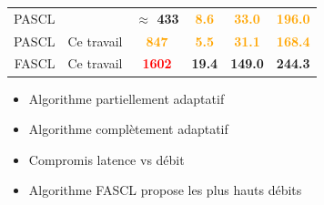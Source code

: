 \documentclass[t,compress,mathserif,12pt,xcolor=dvipsnames]{beamer}
\newcommand{\RED} [1]{\textcolor{red}{\textbf{#1}}}
\newcommand{\ORANGE} [1]{\textcolor{orange}{\textbf{#1}}}
\newcommand{\GREEN} [1]{\textcolor{dgreen}{\textbf{#1}}}
\begin{document}
\begin{frame}
{\begin{table}[ht]
{{\begin{tabular}{r|c|c|c c c}
        PASCL &~\cite{sarkis_fast_2016}          & \GREEN{$\approx$ 433}          & \ORANGE{8.6}           & \ORANGE{33.0 }           & \ORANGE{196.0}           \\
        PASCL & Ce travail                       & \ORANGE{847}                   & \ORANGE{5.5}             & \ORANGE{31.1}            & \ORANGE{168.4}           \\
        \hline
        FASCL & Ce travail                       & \RED{1602}                     & \GREEN{19.4}            & \GREEN{149.0}           & \GREEN{244.3}           \\
      \end{tabular}
      }}
  	\end{table}
 	}

  \begin{itemize}
  	\item<+-> Algorithme partiellement adaptatif
  	\item<+-> Algorithme complètement adaptatif
  	\item<+-> Compromis latence vs débit
  	\item<+-> Algorithme FASCL propose les plus hauts débits
  \end{itemize}
\end{frame}
\end{document}
